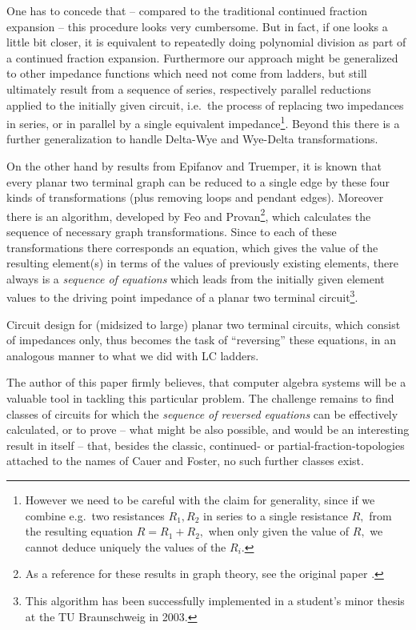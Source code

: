 \documentclass[10pt,twocolumn,pagenumbers]{IEEEtran}
\begin{document}
One has to concede that -- compared to the traditional continued fraction expansion -- this procedure looks very cumbersome. But in fact, if one looks a little bit closer, it is equivalent to repeatedly doing polynomial division as part of a continued fraction expansion. 
Furthermore our approach might be generalized to other impedance functions which need not come from ladders, but still ultimately result from a sequence of series, respectively parallel reductions applied to the initially given circuit, i.e.\ the process of replacing two impedances in series, or in parallel by a single equivalent impedance\footnote{However we need to be careful with the claim for generality, since if we combine e.g.\ two resistances $R_1,R_2$ in series to a single resistance $R,$ from the resulting equation $R=R_1+R_2,$ when only given the value of $R,$ we cannot deduce uniquely the values of the $R_i.$}. Beyond this there is a further generalization to handle Delta-Wye and Wye-Delta transformations. 

On the other hand by results from Epifanov and Truemper, it is known that every planar two terminal graph can be reduced to a single edge by these four kinds of transformations (plus removing loops and pendant edges). Moreover there is an algorithm, developed by Feo and Provan\footnote{As a reference for these results in graph theory, see the original paper \cite{FeoProvan}.}, which calculates the sequence of necessary graph transformations. Since to each of these transformations there corresponds an equation, which gives the value of the resulting element(s) in terms of the values of previously existing elements, there always is a {\sl sequence of equations} which leads from the initially given element values to the driving point impedance of a planar two terminal circuit\footnote{This algorithm has been successfully implemented in a student's minor thesis \cite{DomannStudien} at the TU Braunschweig in 2003.}.

Circuit design for (midsized to large) planar two terminal circuits, which consist of impedances only, thus becomes the task of ``reversing'' these equations, in an analogous manner to what we did with LC ladders.

 The author of this paper firmly believes, that computer algebra systems will be a valuable tool in tackling this particular problem. The challenge remains to find classes of circuits for which the {\sl sequence of reversed equations} can be effectively calculated, or to prove -- what might be also possible, and would be an interesting result in itself -- that, besides the classic, continued- or partial-fraction-topologies attached to the names of Cauer and Foster, no such further classes exist.  
\end{document}
